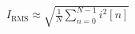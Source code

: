 \documentclass[preview]{standalone}
\begin{document}
\begin{align*}
I_{\mathrm{RMS}} \approx \sqrt{ \frac{1}{N} \sum_{n=0}^{N-1} i^2[n] }
\end{align*}
\end{document}
